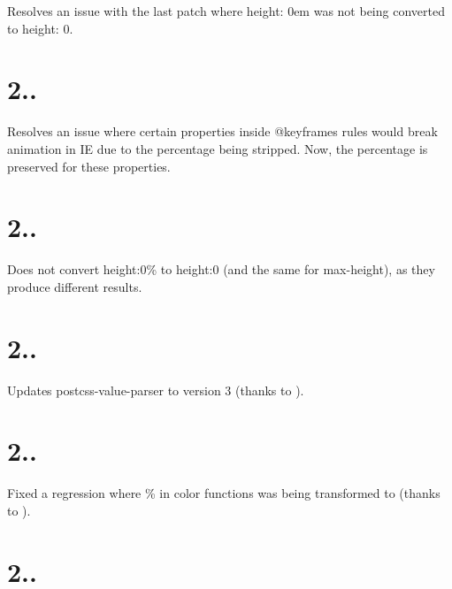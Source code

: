 \begin{DoxyItemize}
\item Resolves an issue with the last patch where {\ttfamily height\+: 0em} was not being converted to {\ttfamily height\+: 0}.
\end{DoxyItemize}

\section*{2..}


\begin{DoxyItemize}
\item Resolves an issue where certain properties inside {\ttfamily @keyframes} rules would break animation in IE due to the percentage being stripped. Now, the percentage is preserved for these properties.
\end{DoxyItemize}

\section*{2..}


\begin{DoxyItemize}
\item Does not convert {\ttfamily height\+:0\%} to {\ttfamily height\+:0} (and the same for {\ttfamily max-\/height}), as they produce different results.
\end{DoxyItemize}

\section*{2..}


\begin{DoxyItemize}
\item Updates postcss-\/value-\/parser to version 3 (thanks to ).
\end{DoxyItemize}

\section*{2..}


\begin{DoxyItemize}
\item Fixed a regression where {\%} in color functions was being transformed to {} (thanks to ).
\end{DoxyItemize}

\section*{2..}


